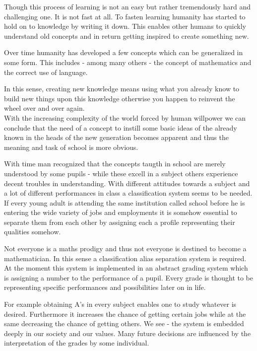 \documentclass[12pt,a4paper]{article}
\begin{document}
  Though this process of learning is not an easy but rather tremendously hard and challenging one. It is not fast at all. To fasten learning humanity has started to hold on to knowledge by writing it down. This enables other humans to quickly understand old concepts and in return getting inspired to create something new. 
  
  Over time humanity has developed a few concepts which can be generalized in some form. This includes - among many others - the concept of mathematics and the correct use of language. 
  
  In this sense, creating new knowledge means using what you already know to build new things upon this knowledge otherwise you happen to reinvent the wheel over and over again. \\
  
  With the increasing complexity of the world forced by human willpower we can conclude that the need of a concept to instill some basic ideas of the already known in the heads of the new generation becomes apparent and thus the meaning and task of school is more obvious.
  
  With time man recognized that the concepts taugth in school are merely understood by some pupils - while these excell in a subject others experience decent troubles in understanding. With different attitudes towards a subject and a lot of different performances in class a classification system seems to be needed. If every young adult is attending the same institution called school before he is entering the wide variety of jobs and employments it is somehow essential to separate them from each other by assigning each a profile representing their qualities somehow. 
  
  Not everyone is a maths prodigy and thus not everyone is destined to become a mathematician. In this sense a classification alias separation system is required. At the moment this system is implemented in an abstract grading system which is assigning a number to the performance of a pupil. Every grade is thought to be representing specific performances and possibilities later on in life. 
  
  For example obtaining A's in every subject enables one to study whatever is desired. Furthermore it increases the chance of getting certain jobs while at the same decreasing the chance of getting others. We see - the system is embedded deeply in our society and our values. Many future decisions are influenced by the interpretation of the grades by some individual. \\
  
\end{document}
